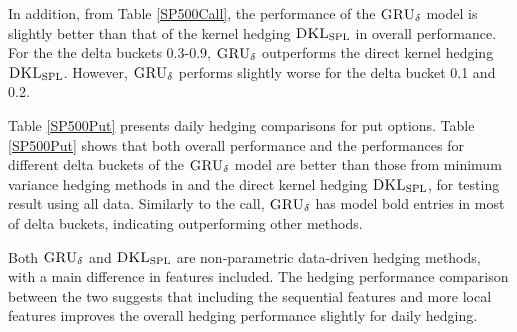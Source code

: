 \documentclass[letterpaper,12pt,titlepage,oneside,final]{book}
\numberwithin{equation}{section}
\theoremstyle{definition}
\newcommand{\model}{\textsc{GRU}_\delta}
\newcommand{\DKLs}{\bf\textsc{DKL}_{\text{SPL}}}
\begin{document}
In addition, from Table \ref{SP500Call}, the performance of the $\model$ model is slightly better than that of the kernel hedging $\DKLs$ in overall performance. For the the delta buckets 0.3-0.9,  $\model$ outperforms the direct kernel hedging $\DKLs$.  However,  $\model$ performs slightly worse for the delta bucket 0.1 and 0.2.

Table \ref{SP500Put}  presents daily hedging comparisons for put options.
Table \ref{SP500Put} shows that both overall performance and the performances for different delta buckets of the $\model$ model are better than those from minimum variance hedging methods in \cite{hulloptimal} and the direct kernel hedging $\DKLs$, for testing result using all data. Similarly to the call, $\model$ has model bold entries in most of delta buckets, indicating outperforming other methods.

 Both $\model$ and $\DKLs$ are non-parametric data-driven hedging  methods, with a main difference in features included. The hedging performance comparison between the two suggests that including the sequential features and more local features improves the overall hedging performance slightly for daily hedging.
\end{document}
